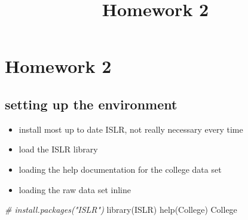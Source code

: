 \documentclass[
]{article}
\title{Homework 2}
\author{}
\date{\vspace{-2.5em}}
\newenvironment{Shaded}{\begin{snugshade}}{\end{snugshade}}
\newcommand{\CommentTok}[1]{\textcolor[rgb]{0.56,0.35,0.01}{\textit{#1}}}
\newcommand{\FunctionTok}[1]{\textcolor[rgb]{0.00,0.00,0.00}{#1}}
\newcommand{\NormalTok}[1]{#1}
\providecommand{\tightlist}{%
  \setlength{\itemsep}{0pt}\setlength{\parskip}{0pt}}
\begin{document}
\maketitle

\hypertarget{homework-2}{%
\section{Homework 2}\label{homework-2}}

\hypertarget{setting-up-the-environment}{%
\subsection{setting up the
environment}\label{setting-up-the-environment}}

\begin{itemize}
\tightlist
\item
  install most up to date ISLR, not really necessary every time
\item
  load the ISLR library
\item
  loading the help documentation for the college data set
\item
  loading the raw data set inline
\end{itemize}

\begin{Shaded}
\begin{Highlighting}[]
\CommentTok{\# install.packages("ISLR")}
\FunctionTok{library}\NormalTok{(ISLR)}
\FunctionTok{help}\NormalTok{(College)}
\NormalTok{College}
\end{Highlighting}
\end{Shaded}
\end{document}
